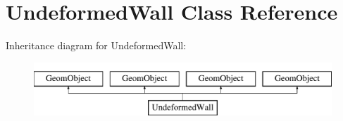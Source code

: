 \hypertarget{classUndeformedWall}{}\section{Undeformed\+Wall Class Reference}
\label{classUndeformedWall}
Inheritance diagram for Undeformed\+Wall\+:\begin{figure}[H]
\begin{center}
\leavevmode
\includegraphics[height=2.000000cm]{classUndeformedWall}
\end{center}
\end{figure}
